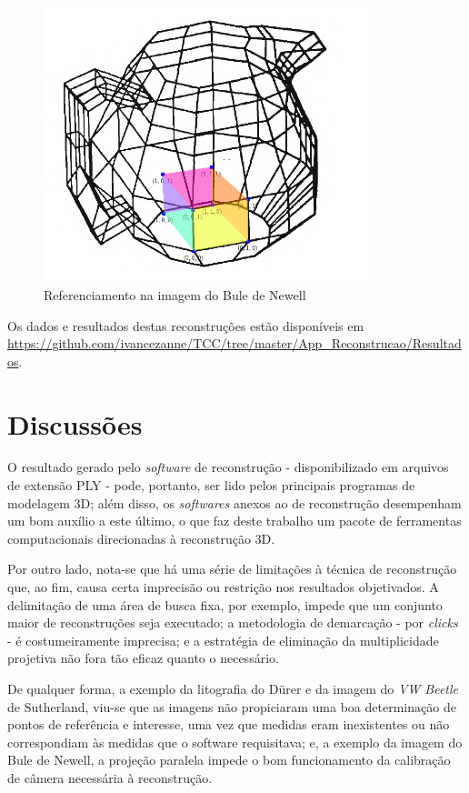 			\begin{figure}[!htb]
				\centering
				\includegraphics[height=8cm]{imagens/printBuleDispensada.png}
				\caption{Referenciamento na imagem do Bule de Newell}
				\label{imagemBuleDispensada}
			\end{figure}
			
			Os dados e resultados destas reconstruções estão disponíveis em \url{https://github.com/ivancezanne/TCC/tree/master/App_Reconstrucao/Resultados}.
			
		\section{Discussões}
			\label{secaoDiscussoes}
			
			O resultado gerado pelo \textit{software} de reconstrução - disponibilizado em arquivos de extensão PLY - pode, portanto, ser lido pelos principais programas de modelagem 3D; além disso, os \textit{softwares} anexos ao de reconstrução desempenham um bom auxílio a este último, o que faz deste trabalho um pacote de ferramentas computacionais direcionadas à reconstrução 3D.
			
			Por outro lado, nota-se que há uma série de limitações à técnica de reconstrução que, ao fim, causa certa imprecisão ou restrição nos resultados objetivados. A delimitação de uma área de busca fixa, por exemplo, impede que um conjunto maior de reconstruções seja executado; a metodologia de demarcação - por \textit{clicks} - é costumeiramente imprecisa; e a estratégia de eliminação da multiplicidade projetiva não fora tão eficaz quanto o necessário.
			
			De qualquer forma, a exemplo da litografia do Dürer e da imagem do \textit{VW Beetle} de Sutherland, viu-se que as imagens não propiciaram uma boa determinação de pontos de referência e interesse, uma vez que medidas eram inexistentes ou não correspondiam às medidas que o software requisitava; e, a exemplo da imagem do Bule de Newell, a projeção paralela impede o bom funcionamento da calibração de câmera necessária à reconstrução.
			
